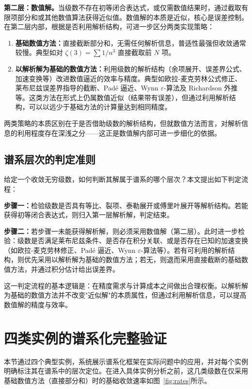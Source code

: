 \textbf{第二层：数值解。}当级数不存在初等闭合表达式，或仅需数值结果时，通过截取有限项部分和或其他数值算法获得近似值。数值解的本质是近似，核心是误差控制。在第二层内部，根据是否利用解析结构，可进一步区分两类实现策略：

\begin{enumerate}[label=（\arabic*）]
  \item \textbf{基础数值方法：}直接截断部分和，无需任何解析信息，普适性最强但收敛通常较慢。典型如对 $\zeta(3) = \sum 1/n^3$ 直接截取前 $N$ 项。
  \item \textbf{以解析解为基础的数值方法：}利用级数的解析结构（余项展开、误差界公式、加速变换等）改进数值逼近的效率与精度。典型如欧拉-麦克劳林公式修正、莱布尼兹误差界指导的截断、Padé 逼近、Wynn $\varepsilon$-算法及 Richardson 外推等。这类方法在形式上仍属数值近似（结果带有误差），但通过利用解析结构，可以以远少于基础方法的计算量达到相同精度。
\end{enumerate}

两类策略的本质区别在于是否借助级数的解析结构，但就数值方法而言，对解析信息的利用程度存在深浅之分——这正是数值解内部可进一步细化的依据。

\subsection{谱系层次的判定准则}

给定一个收敛无穷级数，如何判断其解属于谱系的哪个层次？本文提出如下判定流程：

\textbf{步骤一：}检验级数是否具有等比、裂项、泰勒展开或傅里叶展开等解析结构。若能获得初等闭合表达式，则归入第一层解析解，判定结束。

\textbf{步骤二：}若步骤一未能获得解析解，则必须采用数值解（第二层）。此时进一步检验：级数是否满足莱布尼兹条件、是否存在积分关联、或是否存在已知的加速变换（如欧拉-麦克劳林修正、Padé 逼近、Wynn $\varepsilon$-算法等）。若有可利用的解析结构，则优先采用以解析解为基础的数值方法；若无，则退而采用直接截断的基础数值方法，并通过积分估计给出误差界。

这一判定流程的基本逻辑是：在精度需求与计算成本之间做出合理权衡。以解析解为基础的数值方法并不改变"近似解"的本质属性，但通过利用解析信息，可以提高数值解的精度与效率。

\section{四类实例的谱系化完整验证}

本节通过四个典型实例，系统展示谱系化框架在实际问题中的应用，并对每个实例明确标注其在谱系中的层次定位。在进入具体实例分析之前，这几类级数在仅采用基础数值方法（直接部分和）时的基础收敛速率如图~\ref{fig:rates}所示。

